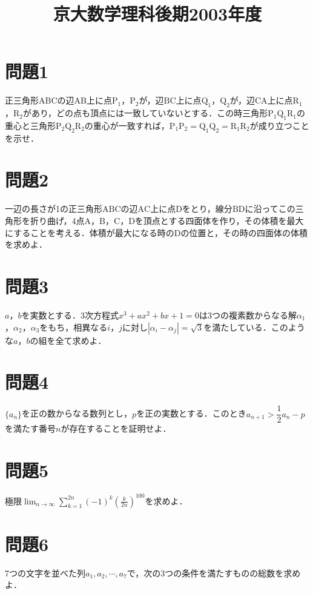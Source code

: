 \documentclass[unicode,12pt, A4j]{ltjsarticle}%
\title{京大数学理科後期2003年度}
\author{}
\date{}
\begin{document}
\maketitle

\section{問題1}
正三角形$\mathrm{ABC}$の辺$\mathrm{AB}$上に点$\mathrm{P}_1$，$\mathrm{P}_2$が，辺$\mathrm{BC}$上に点$\mathrm{Q}_1$，$\mathrm{Q}_2$が，辺$\mathrm{CA}$上に点$\mathrm{R}_1$，$\mathrm{R}_2$があり，どの点も頂点には一致していないとする．この時三角形$\mathrm{P_1Q_1R_1}$の重心と三角形$\mathrm{P_2Q_2R_2}$の重心が一致すれば，$\mathrm{P_1P_2}=\mathrm{Q_1Q_2}=\mathrm{R_1R_2}$が成り立つことを示せ．

\section{問題2}
一辺の長さが1の正三角形$\mathrm{ABC}$の辺$\mathrm{AC}$上に点$\mathrm{D}$をとり，線分$\mathrm{BD}$に沿ってこの三角形を折り曲げ，4点$\mathrm{A}$，$\mathrm{B}$，$\mathrm{C}$，$\mathrm{D}$を頂点とする四面体を作り，その体積を最大にすることを考える．体積が最大になる時の$\mathrm{D}$の位置と，その時の四面体の体積を求めよ．

\section{問題3}
$a$，$b$を実数とする．3次方程式$x^3+ax^2+bx+1=0$は3つの複素数からなる解$\alpha_1$，$\alpha_2$，$\alpha_3$をもち，相異なる$i$，$j$に対し$|\alpha_i-\alpha_j|=\sqrt{3}$を満たしている．このような$a$，$b$の組を全て求めよ．

\section{問題4}
$\{a_n\}$を正の数からなる数列とし，$p$を正の実数とする．このとき$a_{n+1}>\dfrac{1}{2}a_n-p$を満たす番号$n$が存在することを証明せよ．

\section{問題5}
極限${\displaystyle \lim_{n\to\infty}\sum_{k=1}^{2n}(-1)^k\left(\frac{k}{2n}\right)^{100}}$を求めよ．

\section{問題6}
7つの文字を並べた列$a_1,a_2,\cdots,a_7$で，次の3つの条件を満たすものの総数を求めよ．
\end{document}
